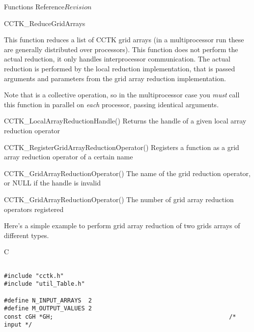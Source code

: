 \begin{cactuspart}{ Functions Reference}{}{$Revision$}
\begin{FunctionDescription}{CCTK\_ReduceGridArrays}
\begin{Discussion}
This function reduces a list of CCTK grid arrays (in a multiprocessor run
these are generally distributed over processors). This function does not perform the actual reduction, it only handles interprocessor communication. The actual reduction is performed by the local reduction implementation, that is passed arguments and parameters
from the grid array reduction implementation.

Note that  is a collective operation, so in the
multiprocessor case you {\em must\/} call this function in parallel on
{\em each\/} processor, passing identical arguments.
\end{Discussion}

\begin{SeeAlsoSection}
\begin{SeeAlso}{CCTK\_LocalArrayReductionHandle()}
Returns the handle of a given local array reduction operator
\end{SeeAlso}

\begin{SeeAlso}{CCTK\_RegisterGridArrayReductionOperator()}
Registers a function as a grid array reduction operator of a certain name
\end{SeeAlso}

\begin{SeeAlso}{CCTK\_GridArrayReductionOperator()}
The name of the grid reduction operator, or NULL if the handle is invalid
\end{SeeAlso}

\begin{SeeAlso}{CCTK\_GridArrayReductionOperator()}
The number of grid array reduction operators registered
\end{SeeAlso}
\end{SeeAlsoSection}

\begin{ExampleSection}
\begin{ExampleDescription}
Here's a simple example to perform grid array reduction of two grids arrays of different types.
\end{ExampleDescription}
\begin{Example}{C}
\begin{verbatim}

#include "cctk.h"
#include "util_Table.h"

#define N_INPUT_ARRAYS  2
#define M_OUTPUT_VALUES 2
const cGH *GH;                                                  /* input */


\end{verbatim}
\end{Example}
\end{ExampleSection}
\end{FunctionDescription}
\end{cactuspart}

